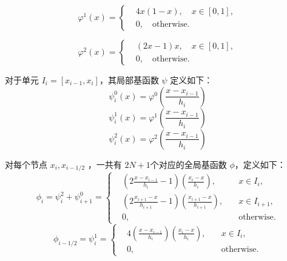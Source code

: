 \documentclass[11pt]{ctexart}
\begin{document}
\begin{equation}
     \varphi^1(x) = \left\{
     \begin{aligned}
          &4x(1-x) , \quad x \in [0,1], \\
          &0, \quad \text{otherwise}.
     \end{aligned}
     \right.
\end{equation}

\begin{equation}
     \varphi^2(x) = \left\{
     \begin{aligned}
          &(2x-1)x , \quad x \in [0,1], \\
          &0, \quad \text{otherwise}.
     \end{aligned}
     \right.
\end{equation}

对于单元 $ I_i = [x_{i-1},x_i] $，其局部基函数 $ \psi $ 定义如下：
\begin{equation}
     \psi^0_i(x) = \varphi^0\left(\frac{x-x_{i-1}}{h_i}\right)
\end{equation}
\begin{equation}
     \psi^1_i(x) = \varphi^1\left(\frac{x-x_{i-1}}{h_i}\right)
\end{equation}
\begin{equation}
     \psi^2_i(x) = \varphi^2\left(\frac{x-x_{i-1}}{h_i}\right)
\end{equation}

对每个节点 $ x_i,x_{i-1/2} $ ，一共有 $ 2N+1 $个对应的全局基函数 $ \phi $，定义如下：
\begin{equation}
     \phi_{i} = \psi^2_{i}+\psi^0_{i+1} =\left\{
          \begin{aligned}
               &\left(2\frac{x-x_{i-1}}{h_i}-1\right)\left(\frac{x_i-x}{h_i}\right),& \quad x \in I_i, \\
               &\left(2\frac{x_{i+1}-x}{h_{i+1}}-1\right)\left(\frac{x_{i+1}-x}{h_{i+1}}\right),& \quad x \in I_{i+1}, \\     
               &0,& \quad \text{otherwise}. 
          \end{aligned}
     \right.
\end{equation}
\begin{equation}
     \phi_{i-1/2} = \psi^1_{i}= \left\{
          \begin{aligned}
               &4\left(\frac{x-x_{i-1}}{h_i}\right)\left(\frac{x_i-x}{h_i}\right),& \quad x \in I_i, \\
               &0,& \quad \text{otherwise}.
          \end{aligned}
     \right.
\end{equation}
\end{document}
